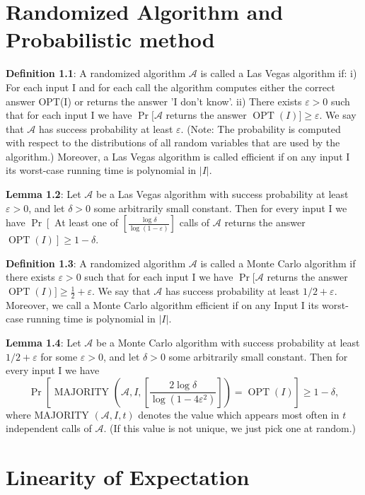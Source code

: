 \section{Randomized Algorithm and Probabilistic method}
\textbf{Definition 1.1}: A randomized algorithm $\mathcal{A}$ is called a Las Vegas algorithm if:
i) For each input I and for each call the algorithm computes either the correct answer OPT(I) or returns the answer 'I don't know'.
ii) There exists $\varepsilon>0$ such that for each input I we have
$\operatorname{Pr}[\mathcal{A}$ returns the answer $\operatorname{OPT}(I)] \geq \varepsilon$.
We say that $\mathcal{A}$ has success probability at least $\varepsilon$. (Note: The probability is computed with respect to the distributions of all random variables that are used by the algorithm.)
Moreover, a Las Vegas algorithm is called efficient if on any input I its worst-case running time is polynomial in $|I|$.

\textbf{Lemma 1.2}: Let $\mathcal{A}$ be a Las Vegas algorithm with success probability at least $\varepsilon>0$, and let $\delta>0$ some arbitrarily small constant. Then for every input I we have
$\operatorname{Pr}\left[\right.$ At least one of $\left[\frac{\log \delta}{\log (1-\varepsilon)}\right]$ calls of $\mathcal{A}$ returns the answer $\left.\operatorname{OPT}(I)\right] \geq 1-\delta$.

\textbf{Definition 1.3}: A randomized algorithm $\mathcal{A}$ is called a Monte Carlo algorithm if there exists $\varepsilon>0$ such that for each input I we have
$\operatorname{Pr}[\mathcal{A}$ returns the answer $\operatorname{OPT}(I)] \geq \frac{1}{2}+\varepsilon$.
We say that $\mathcal{A}$ has success probability at least $1 / 2+\varepsilon$. Moreover, we call a Monte Carlo algorithm efficient if on any Input I its worst-case running time is polynomial in $|I|$.

\textbf{Lemma 1.4}: Let $\mathcal{A}$ be a Monte Carlo algorithm with success probability at least $1 / 2+\varepsilon$ for some $\varepsilon>0$, and let $\delta>0$ some arbitrarily small constant. Then for every input I we have
$$
\operatorname{Pr}\left[\text { MAJORITY }\left(\mathcal{A}, I,\left[\frac{2 \log \delta}{\log \left(1-4 \varepsilon^{2}\right)}\right]\right)=\operatorname{OPT}(I)\right] \geq 1-\delta,
$$
where MAJORITY $(\mathcal{A}, I, t)$ denotes the value which appears most often in $t$ independent calls of $\mathcal{A}$. (If this value is not unique, we just pick one at random.)

\section{Linearity of Expectation}

